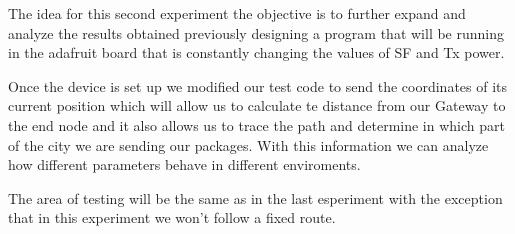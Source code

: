The idea for this second experiment the objective is to further expand and analyze the results obtained previously 
designing a program that will be running in the adafruit board that is constantly changing the values of SF and Tx power. 


Once the device is set up we modified our test code to send the coordinates of its current position 
which will allow us to calculate te distance from our Gateway to the end node and it also allows us 
to trace the path and determine in which part of the city we are sending our packages. With this 
information we can analyze how different parameters behave in different enviroments.

The area of testing will be the same as in the last esperiment with the exception that in this experiment
we won't follow a fixed route.
